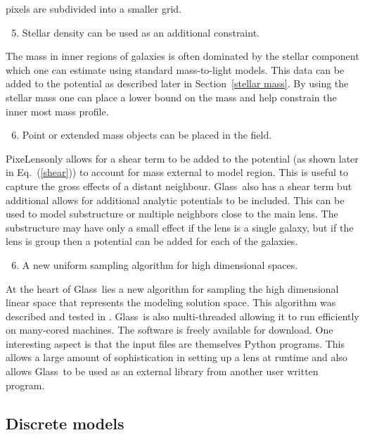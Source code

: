 \documentclass[galley]{mn2e}
\newcommand{\Glass}{{\sc Glass}}
\newcommand{\PixeLens}{{\sc PixeLens}}
\newcommand{\eqnref}[1] {Eq.~(\ref{#1})}
\newcommand{\secref}[1] {Section~\ref{#1}}
\begin{document}
pixels are subdivided into a smaller grid.
%
\begin{enumerate}
  \setcounter{enumi}{4}
  \item Stellar density can be used as an additional constraint.  
\end{enumerate}
%
The mass in inner regions of galaxies is often dominated by the stellar component
which one can estimate using standard mass-to-light models. This data can be added
to the potential as described later in \secref{stellar mass}. By using the stellar
mass one can place a lower bound on the mass and help constrain the inner most
mass profile.
%
\begin{enumerate}
  \setcounter{enumi}{5}
  \item Point or extended mass objects can be placed in the field.
\end{enumerate}
%
\PixeLens only allows for a shear term to be added to the potential (as shown
later in \eqnref{shear}) to account for mass external to model region. This
is useful to capture the gross effects of a distant neighbour. \Glass\ also
has a shear term but additional allows for additional analytic potentials to
be included. This can be used to model substructure or multiple neighbors close
to the main lens. The substructure may have only a small effect if the lens is
a single galaxy, but if the lens is group then a potential can be added for
each of the galaxies.
%
\begin{enumerate}
  \setcounter{enumi}{5}
  \item A new uniform sampling algorithm for high dimensional spaces.
\end{enumerate}
%
At the heart of \Glass\ lies a new algorithm for sampling the high dimensional
linear space that represents the modeling solution space. This algorithm was
described and tested in \cite{}. \Glass\ is also multi-threaded allowing it to
run efficiently on many-cored machines.  The software is freely available for
download. One interesting aspect is that the input files are themselves Python
programs. This allows a large amount of sophistication in setting up a lens at
runtime and also allows \Glass\ to be used as an external library from another
user written program.

\subsection{Discrete models}
\end{document}
